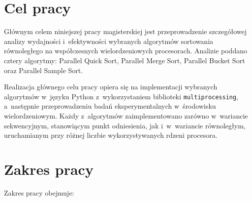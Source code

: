 \section{Cel pracy}
\label{sec:CelPracy}

Głównym celem niniejszej pracy magisterskiej jest przeprowadzenie szczegółowej analizy wydajności i~efektywności wybranych algorytmów 
sortowania równoległego na współczesnych wielordzeniowych procesorach. Analizie poddano cztery algorytmy: 
Parallel Quick Sort, Parallel Merge Sort, Parallel Bucket Sort oraz Parallel Sample Sort.

Realizacja głównego celu pracy opiera się na implementacji wybranych algorytmów w~języku Python z~wykorzystaniem 
biblioteki \texttt{multiprocessing}, a~następnie przeprowadzeniu badań eksperymentalnych w~środowisku wielordzeniowym. 
Każdy z~algorytmów zaimplementowano zarówno w~wariancie sekwencyjnym, stanowiącym punkt odniesienia, 
jak i~w~wariancie równoległym, uruchamianym przy różnej liczbie wykorzystywanych rdzeni procesora.

\section{Zakres pracy}
\label{sec:ZakresPracy}

Zakres pracy obejmuje:

